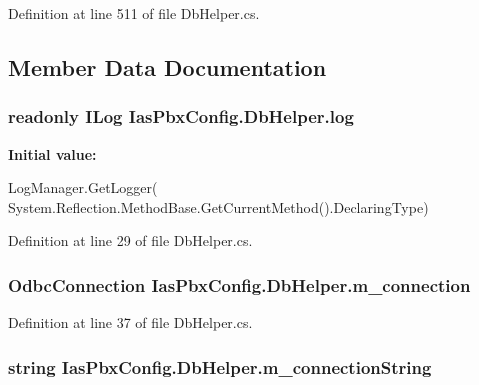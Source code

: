 Definition at line 511 of file DbHelper.cs.

\subsection{Member Data Documentation}
\hypertarget{class_ias_pbx_config_1_1_db_helper_a0857140c11e1ae5ca696a95337a655b2}{
\subsubsection[{log}]{\setlength{\rightskip}{0pt plus 5cm}readonly ILog {\bf IasPbxConfig.DbHelper.log}}}
\label{class_ias_pbx_config_1_1_db_helper_a0857140c11e1ae5ca696a95337a655b2}
{\bfseries Initial value:}
\begin{DoxyCode}
 LogManager.GetLogger(
            System.Reflection.MethodBase.GetCurrentMethod().DeclaringType)
\end{DoxyCode}


Definition at line 29 of file DbHelper.cs.\hypertarget{class_ias_pbx_config_1_1_db_helper_ad2f4da25190daab4caadf0fd961fdc7a}{
\subsubsection[{m\_\-connection}]{\setlength{\rightskip}{0pt plus 5cm}OdbcConnection {\bf IasPbxConfig.DbHelper.m\_\-connection}}}
\label{class_ias_pbx_config_1_1_db_helper_ad2f4da25190daab4caadf0fd961fdc7a}


Definition at line 37 of file DbHelper.cs.\hypertarget{class_ias_pbx_config_1_1_db_helper_acec1410fc508a1269f93e1e378aa3006}{
\subsubsection[{m\_\-connectionString}]{\setlength{\rightskip}{0pt plus 5cm}string {\bf IasPbxConfig.DbHelper.m\_\-connectionString}}}
\label{class_ias_pbx_config_1_1_db_helper_acec1410fc508a1269f93e1e378aa3006}


